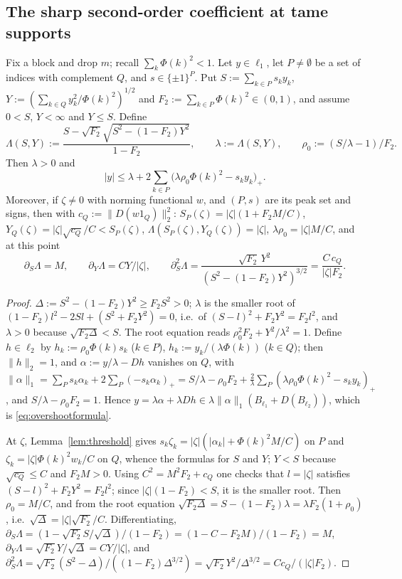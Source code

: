 \subsection{The sharp second-order coefficient at tame supports}

\begin{lemma}\label{lem:localformula}
Fix a block and drop $m$; recall $\sum_k\Phi(k)^2<1$.  Let $y\in\ell_1$, let
$P\ne\emptyset$ be a set of indices with complement $Q$, and
$s\in\{\pm1\}^P$.  Put $S:=\sum_{k\in P}s_ky_k$,
$Y:=(\sum_{k\in Q}y_k^2/\Phi(k)^2)^{1/2}$ and $F_2:=\sum_{k\in P}\Phi(k)^2\in
(0,1)$, and assume $0<S$, $Y<\infty$ and $Y\le S$.  Define
\[
 \Lambda(S,Y):=\frac{S-\sqrt{F_2}\sqrt{S^2-(1-F_2)Y^2}}{1-F_2},\qquad
 \lambda:=\Lambda(S,Y),\qquad \rho_0:=(S/\lambda-1)/F_2 .
\]
Then $\lambda>0$ and
\begin{equation}\label{eq:overshootformula}
 |y|\le\lambda+2\sum_{k\in P}\big(\lambda\rho_0\Phi(k)^2-s_ky_k\big)_+ .
\end{equation}
Moreover, if $\zeta\ne0$ with norming functional $w$, and $(P,s)$ are its
peak set and signs, then with $c_Q:=\|D(w1_Q)\|_2^2$:
$S_P(\zeta)=|\zeta|(1+F_2M/C)$, $Y_Q(\zeta)=|\zeta|\sqrt{c_Q}/C<S_P(\zeta)$,
$\Lambda(S_P(\zeta),Y_Q(\zeta))=|\zeta|$, $\lambda\rho_0=|\zeta|M/C$, and at
this point
\[
 \partial_S\Lambda=M,\qquad \partial_Y\Lambda=CY/|\zeta|,\qquad
 \partial_S^2\Lambda=\frac{\sqrt{F_2}\,Y^2}{(S^2-(1-F_2)Y^2)^{3/2}}
 =\frac{C\,c_Q}{|\zeta|F_2}.
\]
\end{lemma}

\begin{proof}
$\Delta:=S^2-(1-F_2)Y^2\ge F_2S^2>0$; $\lambda$ is the smaller root of
$(1-F_2)l^2-2Sl+(S^2+F_2Y^2)=0$, i.e.\ of $(S-l)^2+F_2Y^2=F_2l^2$, and
$\lambda>0$ because $\sqrt{F_2\Delta}<S$.  The root equation reads
$\rho_0^2F_2+Y^2/\lambda^2=1$.  Define $h\in\ell_2$ by
$h_k:=\rho_0\Phi(k)s_k$ ($k\in P$), $h_k:=y_k/(\lambda\Phi(k))$ ($k\in Q$);
then $\|h\|_2=1$, and $\alpha:=y/\lambda-Dh$ vanishes on $Q$, with
$\|\alpha\|_1=\sum_Ps_k\alpha_k+2\sum_P(-s_k\alpha_k)_+=S/\lambda-\rho_0F_2
+\frac2\lambda\sum_P(\lambda\rho_0\Phi(k)^2-s_ky_k)_+$, and
$S/\lambda-\rho_0F_2=1$.  Hence $y=\lambda\alpha+\lambda Dh\in\lambda
\|\alpha\|_1(B_{\ell_1}+D(B_{\ell_2}))$, which is \eqref{eq:overshootformula}.

At $\zeta$, Lemma~\ref{lem:threshold} gives $s_k\zeta_k=|\zeta|(|\alpha_k|+
\Phi(k)^2M/C)$ on $P$ and $\zeta_k=|\zeta|\Phi(k)^2w_k/C$ on $Q$, whence
the formulas for $S$ and $Y$; $Y<S$ because $\sqrt{c_Q}\le C$ and $F_2M>0$.
Using $C^2=M^2F_2+c_Q$ one checks that $l=|\zeta|$ satisfies
$(S-l)^2+F_2Y^2=F_2l^2$; since $|\zeta|(1-F_2)<S$, it is the smaller root.
Then $\rho_0=M/C$, and from the root equation
$\sqrt{F_2\Delta}=S-(1-F_2)\lambda=\lambda F_2(1+\rho_0)$, i.e.\
$\sqrt\Delta=|\zeta|\sqrt{F_2}/C$.  Differentiating,
$\partial_S\Lambda=(1-\sqrt{F_2}S/\sqrt\Delta)/(1-F_2)=(1-C-F_2M)/(1-F_2)=M$,
$\partial_Y\Lambda=\sqrt{F_2}Y/\sqrt\Delta=CY/|\zeta|$, and
$\partial^2_S\Lambda=\sqrt{F_2}(S^2-\Delta)/((1-F_2)\Delta^{3/2})=
\sqrt{F_2}Y^2/\Delta^{3/2}=Cc_Q/(|\zeta|F_2)$.
\end{proof}

